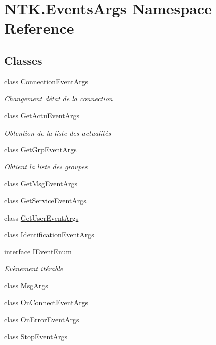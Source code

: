 \hypertarget{namespace_n_t_k_1_1_events_args}{}\section{N\+T\+K.\+Events\+Args Namespace Reference}
\label{namespace_n_t_k_1_1_events_args}
\subsection*{Classes}
\begin{DoxyCompactItemize}
\item 
class \mbox{\hyperlink{class_n_t_k_1_1_events_args_1_1_connection_event_args}{Connection\+Event\+Args}}
\begin{DoxyCompactList}\small\item\em Changement d\textquotesingle{}état de la connection \end{DoxyCompactList}\item 
class \mbox{\hyperlink{class_n_t_k_1_1_events_args_1_1_get_actu_event_args}{Get\+Actu\+Event\+Args}}
\begin{DoxyCompactList}\small\item\em Obtention de la liste des actualités \end{DoxyCompactList}\item 
class \mbox{\hyperlink{class_n_t_k_1_1_events_args_1_1_get_grp_event_args}{Get\+Grp\+Event\+Args}}
\begin{DoxyCompactList}\small\item\em Obtient la liste des groupes \end{DoxyCompactList}\item 
class \mbox{\hyperlink{class_n_t_k_1_1_events_args_1_1_get_msg_event_args}{Get\+Msg\+Event\+Args}}
\item 
class \mbox{\hyperlink{class_n_t_k_1_1_events_args_1_1_get_service_event_args}{Get\+Service\+Event\+Args}}
\item 
class \mbox{\hyperlink{class_n_t_k_1_1_events_args_1_1_get_user_event_args}{Get\+User\+Event\+Args}}
\item 
class \mbox{\hyperlink{class_n_t_k_1_1_events_args_1_1_identification_event_args}{Identification\+Event\+Args}}
\item 
interface \mbox{\hyperlink{interface_n_t_k_1_1_events_args_1_1_i_event_enum}{I\+Event\+Enum}}
\begin{DoxyCompactList}\small\item\em Evènement itérable \end{DoxyCompactList}\item 
class \mbox{\hyperlink{class_n_t_k_1_1_events_args_1_1_msg_args}{Msg\+Args}}
\item 
class \mbox{\hyperlink{class_n_t_k_1_1_events_args_1_1_on_connect_event_args}{On\+Connect\+Event\+Args}}
\item 
class \mbox{\hyperlink{class_n_t_k_1_1_events_args_1_1_on_error_event_args}{On\+Error\+Event\+Args}}
\item 
class \mbox{\hyperlink{class_n_t_k_1_1_events_args_1_1_stop_event_args}{Stop\+Event\+Args}}
\end{DoxyCompactItemize}
